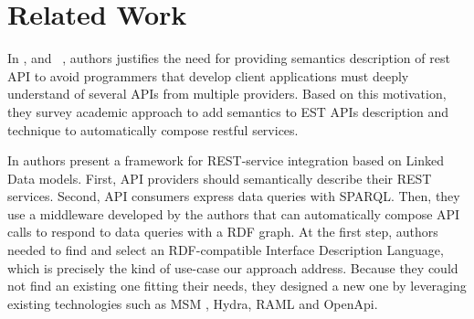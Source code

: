 \section{Related Work}







In \cite{verborgh_rest_2014}, and ~\cite{7195633}, authors justifies the need for providing semantics description of rest API to avoid programmers that develop client applications must deeply understand of several APIs from multiple providers. Based on this motivation, they survey academic approach to add semantics to  EST APIs description and technique to automatically compose restful services. %



In \cite{serrano2017linked} authors present a framework for REST-service integration based on Linked Data models. First, API providers should semantically describe their REST services. Second, API consumers express data queries with SPARQL. Then, they use a middleware developed by the authors that can automatically compose API calls to respond to data queries with a RDF graph.
At the first step, authors needed to find and select an RDF-compatible Interface Description Language, which is precisely the kind of use-case our approach address. Because they could not find an existing one fitting their needs, they designed a new one by leveraging existing technologies such as MSM \cite{pedrinaci2010toward}, Hydra, RAML and OpenApi. %

